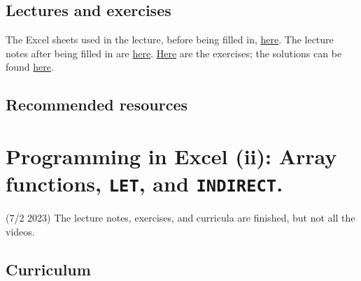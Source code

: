 \documentclass[
  letterpaper,
  DIV=11,
  numbers=noendperiod]{scrreprt}
\begin{document}
\hypertarget{lectures-and-exercises-3}{%
\section{Lectures and exercises}\label{lectures-and-exercises-3}}

The Excel sheets used in the lecture, before being filled in,
\href{https://github.com/BI-DS/ELE-3915/blob/main/slides/lecture04.xlsx}{here}.
The lecture notes after being filled in are
\href{https://github.com/BI-DS/ELE-3915/blob/main/slides/lecture04_solutions.xlsx}{here}.
\href{https://github.com/BI-DS/ELE-3915/blob/main/exercises/exercises04.xlsx}{Here}
are the exercises; the solutions can be found
\href{https://github.com/BI-DS/ELE-3915/blob/main/exercises/exercises04_solutions.xlsx}{here}.

\hypertarget{recommended-resources-3}{%
\section{Recommended resources}\label{recommended-resources-3}}


\hypertarget{programming-in-excel-ii-array-functions-let-and-indirect.}{%
\chapter{\texorpdfstring{Programming in Excel (ii): Array functions,
\texttt{LET}, and
\texttt{INDIRECT}.}{Programming in Excel (ii): Array functions, LET, and INDIRECT.}}\label{programming-in-excel-ii-array-functions-let-and-indirect.}}

\begin{tcolorbox}[enhanced jigsaw, colbacktitle=quarto-callout-warning-color!10!white, bottomrule=.15mm, toprule=.15mm, colback=white, coltitle=black, bottomtitle=1mm, colframe=quarto-callout-warning-color-frame, opacitybacktitle=0.6, titlerule=0mm, left=2mm, title=\textcolor{quarto-callout-warning-color}{\faExclamationTriangle}\hspace{0.5em}{Warning}, opacityback=0, arc=.35mm, leftrule=.75mm, rightrule=.15mm, toptitle=1mm, breakable]

(7/2 2023) The lecture notes, exercises, and curricula are finished, but
not all the videos.

\end{tcolorbox}

\hypertarget{curriculum-4}{%
\section{Curriculum}\label{curriculum-4}}
\end{document}
